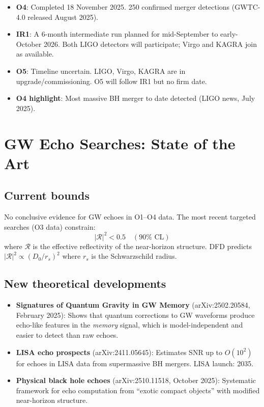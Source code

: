 \documentclass[11pt,a4paper]{article}
\begin{document}
\begin{itemize}
\item \textbf{O4}: Completed 18 November 2025. 250 confirmed merger detections (GWTC-4.0 released August 2025).
\item \textbf{IR1}: A 6-month intermediate run planned for mid-September to early-October 2026. Both LIGO detectors will participate; Virgo and KAGRA join as available.
\item \textbf{O5}: Timeline uncertain. LIGO, Virgo, KAGRA are in upgrade/commissioning. O5 will follow IR1 but no firm date.
\item \textbf{O4 highlight}: Most massive BH merger to date detected (LIGO news, July 2025).
\end{itemize}

\section{GW Echo Searches: State of the Art}

\subsection{Current bounds}

No conclusive evidence for GW echoes in O1--O4 data. The most recent targeted searches (O3 data) constrain:
\begin{equation}
|\mathcal{R}|^2 < 0.5 \quad (90\% \text{ CL})
\end{equation}
where $\mathcal{R}$ is the effective reflectivity of the near-horizon structure. DFD predicts $|\mathcal{R}|^2 \propto (D_0/r_s)^2$ where $r_s$ is the Schwarzschild radius.

\subsection{New theoretical developments}

\begin{itemize}
\item \textbf{Signatures of Quantum Gravity in GW Memory} (arXiv:2502.20584, February 2025): Shows that quantum corrections to GW waveforms produce echo-like features in the \emph{memory} signal, which is model-independent and easier to detect than raw echoes.

\item \textbf{LISA echo prospects} (arXiv:2411.05645): Estimates SNR up to $O(10^2)$ for echoes in LISA data from supermassive BH mergers. LISA launch: 2035.

\item \textbf{Physical black hole echoes} (arXiv:2510.11518, October 2025): Systematic framework for echo computation from ``exotic compact objects'' with modified near-horizon structure.
\end{itemize}
\end{document}
